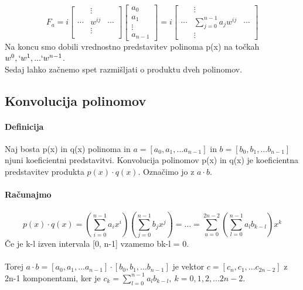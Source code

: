\documentclass[a4paper,10pt]{article}
\begin{document}
$$
F_a = i
\left [
\begin{array}{ccc}
 & \vdots & \\
\cdots & w^{ij} & \cdots \\
 & \vdots & \\
\end{array}
\right ]
\left [
\begin{array}{c}
a_0 \\
a_1 \\
\vdots \\
a_{n-1}
\end{array}
\right ]
= i
\left [
\begin{array}{ccc}
 & \vdots & \\
\cdots & \sum_{j=0}^{n-1}a_jw^{ij} & \cdots \\
 & \vdots &
\end{array}
\right ]
$$
Na koncu smo dobili vrednostno predstavitev polinoma p(x) na to\v ckah $w^{0}, ` w^{1}, ... ` w^{n-1}$.\\
Sedaj lahko za\v cnemo spet razmi\v sljati o produktu dveh polinomov.

\subsection{Konvolucija polinomov}

\paragraph{Definicija}
Naj bosta p(x) in q(x) polinoma in $a = [a_{0}, a_{1},... a_{n-1}] $ in $b = [ b_{0},  b_{1},... b_{n-1} ]$ njuni koeficientni predstavitvi. Konvolucija polinomov p(x) in q(x) je koeficientna predstavitev produkta $p(x) \cdot q(x) $. Ozna\v cimo jo z $a \cdot b$.

\paragraph{Ra\v cunajmo}
$$
p(x) \cdot q(x) = 
(\sum_{i=0}^{n-1} a_{i}x^{i} )
(\sum_{j=0}^{n-1} b_{j}x^{j})
=
\ldots
=
\sum_{u=0}^{2n-2}
(\sum_{l=0}^{n-1} a_{l}b_{k-l})x^{k}
$$
\v Ce je k-l izven intervala [0, n-1] vzamemo bk-l = 0.\\
\\
Torej $a \cdot b = [a_{0}, a_{1},...a_{n-1}] \cdot [b_{0}, b_{1}, ... b_{n-1}]$ je vektor $c = [c_{n}, c_{1},... c_{2n-2}]$ z 2n-1 komponentami, ker je $c_k = \sum_{l=0}^{n-1} a_{l}b_{k-l}, ~ k = 0, 1, 2,... 2n-2$.
\end{document}
